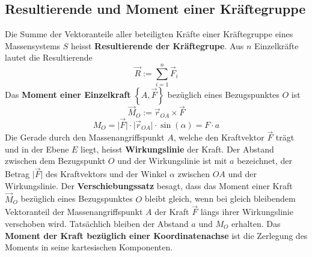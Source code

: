 \subsection{Resultierende und Moment einer Kräftegruppe}
Die Summe der Vektoranteile aller beteiligten Kräfte einer Kräftegruppe eines Massensystems $S$ heisst \textbf{Resultierende der Kräftegrupe}. Aus $n$ Einzelkräfte lautet die Resultierende
\begin{equation}
\boxed{\overrightarrow{R}:=\displaystyle \sum_{i=1}^n\overrightarrow{F}_i}
\end{equation}
Das \textbf{Moment einer Einzelkraft} $\left\{A, \overrightarrow{F}\right\}$ bezüglich eines Bezugspunktes $O$ ist
\begin{equation}
\boxed{\overrightarrow{M}_O:=\overrightarrow{r}_{OA}\times \overrightarrow{F}}
\end{equation}
\begin{equation}
\boxed{M_O=\Big\vert\overrightarrow{F}\Big\vert\cdot \Big\vert\overrightarrow{r}_{OA}\Big\vert\cdot \sin\left(\alpha\right)=F\cdot a}
\end{equation}
Die Gerade durch den Massenangriffspunkt $A$, welche den Kraftvektor $\overrightarrow{F}$ trägt und in der Ebene $E$ liegt, heisst \textbf{Wirkungslinie} der Kraft. Der Abstand zwischen dem Bezugspunkt $O$ und der Wirkungslinie ist mit $a$ bezeichnet, der Betrag $\Big\vert\overrightarrow{F}\Big\vert$ des Kraftvektors und der Winkel $\alpha$ zwischen $OA$ und der Wirkungslinie.
\newline\newline
Der \textbf{Verschiebungssatz} besagt, dass das Moment einer Kraft $\overrightarrow{M}_O$ bezüglich eines Bezugspunktes $O$ bleibt gleich, wenn bei gleich bleibendem Vektoranteil der Massenangriffspunkt $A$ der Kraft $\overrightarrow{F}$ längs ihrer Wirkungslinie verschoben wird. Tatsächlich bleiben der Abstand $a$ und $M_O$ erhalten. 
\newline\newline
Das \textbf{Moment der Kraft bezüglich einer Koordinatenachse} ist die Zerlegung des Moments in seine kartesischen Komponenten.  
